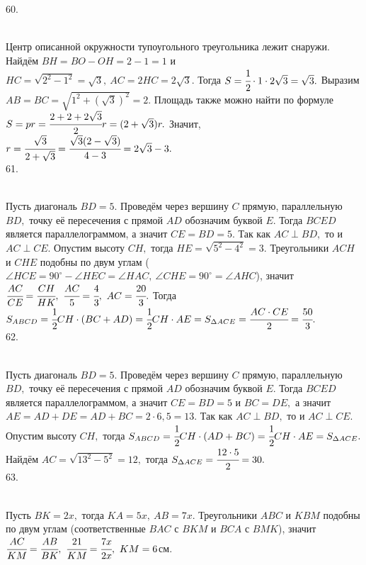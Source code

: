 60. \begin{figure}[ht!]
\end{figure}\\
Центр описанной окружности тупоугольного треугольника лежит снаружи. Найдём $BH=BO-OH=2-1=1$ и $HC=\sqrt{2^2-1^2}=\sqrt{3},\ AC=2HC=2\sqrt{3}.$ Тогда $S=\cfrac{1}{2}\cdot1\cdot2\sqrt{3}=\sqrt{3}.$ Выразим $AB=BC=\sqrt{1^2+(\sqrt{3})^2}=2.$ Площадь также можно найти по формуле $S=pr=\cfrac{2+2+2\sqrt{3}}{2}r=(2+\sqrt{3})r.$ Значит, $r=\cfrac{\sqrt{3}}{2+\sqrt{3}}=\cfrac{\sqrt{3}(2-\sqrt{3})}{4-3}=2\sqrt{3}-3.$\\
61. \begin{figure}[ht!]
\end{figure}\\
Пусть диагональ $BD=5.$ Проведём через вершину $C$ прямую, параллельную $BD,$ точку её пересечения с прямой $AD$ обозначим буквой $E.$ Тогда $BCED$ является параллелограммом, а значит $CE=BD=5.$ Так как $AC\perp BD,$ то и $AC\perp CE.$ Опустим высоту $CH,$ тогда $HE=\sqrt{5^2-4^2}=3.$ Треугольники $ACH$ и $CHE$ подобны по двум углам ($\angle HCE=90^\circ-\angle HEC=\angle HAC,\ \angle CHE=90^\circ=\angle AHC$), значит $\cfrac{AC}{CE}=\cfrac{CH}{HK},\ \cfrac{AC}{5}=\cfrac{4}{3},\ AC=\cfrac{20}{3}.$ Тогда $S_{ABCD}=\cfrac{1}{2}CH\cdot(BC+AD)=\cfrac{1}{2}CH\cdot AE=S_{\Delta ACE}=\cfrac{AC\cdot CE}{2}=\cfrac{50}{3}.$\\
62. \begin{figure}[ht!]
\end{figure}\\
Пусть диагональ $BD=5.$ Проведём через вершину $C$ прямую, параллельную $BD,$ точку её пересечения с прямой $AD$ обозначим буквой $E.$ Тогда $BCED$ является параллелограммом, а значит $CE=BD=5$ и $BC=DE,$ а значит $AE=AD+DE=AD+BC=2\cdot6,5=13.$ Так как $AC\perp BD,$ то и $AC\perp CE.$
Опустим высоту $CH,$ тогда $S_{ABCD}=\cfrac{1}{2} CH\cdot (AD+BC)=\cfrac{1}{2} CH\cdot AE=S_{\Delta ACE}.$ Найдём $AC=\sqrt{13^2-5^2}=12,$ тогда $S_{\Delta ACE}=\cfrac{12\cdot5}{2}=30.$\\
63. \begin{figure}[ht!]
\end{figure}\\
Пусть $BK=2x,$ тогда $KA=5x,\ AB=7x.$ Треугольники $ABC$ и $KBM$ подобны по двум углам (соответственные $BAC$ с $BKM$ и $BCA$ с $BMK$), значит $\cfrac{AC}{KM}=\cfrac{AB}{BK},\ \cfrac{21}{KM}=\cfrac{7x}{2x},\ KM=6$см.\\
